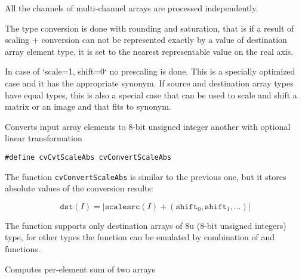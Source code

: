 All the channels of multi-channel arrays are processed independently.

The type conversion is done with rounding and saturation, that is if a
result of scaling + conversion can not be represented exactly by a value
of destination array element type, it is set to the nearest representable
value on the real axis.

In case of `scale=1, shift=0` no prescaling is done. This is a specially
optimized case and it has the appropriate  synonym. If
source and destination array types have equal types, this is also a
special case that can be used to scale and shift a matrix or an image
and that fits to  synonym.


Converts input array elements to 8-bit unsigned integer another with optional linear transformation


\begin{lstlisting}
#define cvCvtScaleAbs cvConvertScaleAbs
\end{lstlisting}

\begin{description}
\end{description}


The function \texttt{cvConvertScaleAbs} is similar to the previous one, but it stores absolute values of the conversion results:

\[
\texttt{dst}(I) = |\texttt{scale} \texttt{src}(I) + (\texttt{shift}_0,\texttt{shift}_1,...)|
\]

The function supports only destination arrays of 8u (8-bit unsigned integers) type, for other types the function can be emulated by combination of  and  functions.


Computes per-element sum of two arrays


\begin{description}
\end{description}

